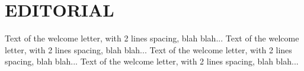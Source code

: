 \vspace*{0.6cm}
\section*{\centering \normalfont \LARGE EDITORIAL}
\vspace*{0.6cm}
\doublespace

 \begin{center}
	 \begin{minipage}[h]{14cm}
	 Text of the welcome letter, with 2 lines spacing, blah blah...
	 Text of the welcome letter, with 2 lines spacing, blah blah...
	 Text of the welcome letter, with 2 lines spacing, blah blah...
	 Text of the welcome letter, with 2 lines spacing, blah blah...
	 \end{minipage}
	\end{center}
\singlespace
\newpage